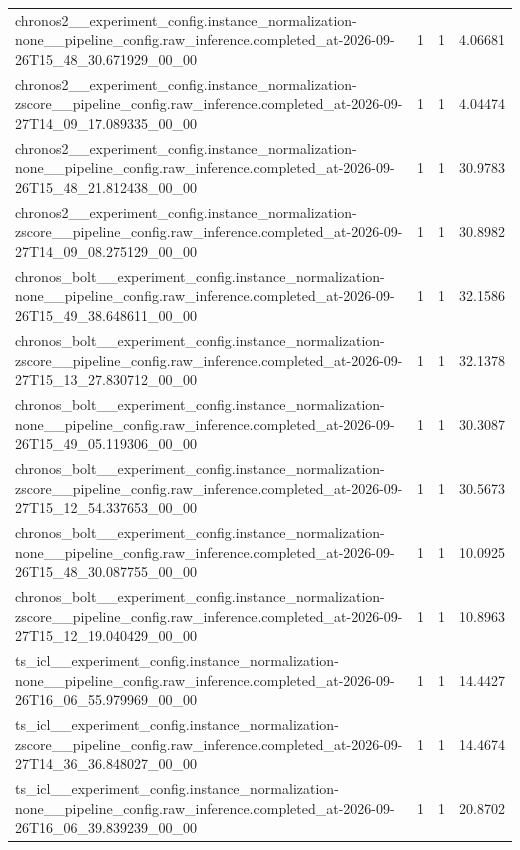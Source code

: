 \begin{tabular}{llll}
chronos2\_\_experiment\_config.instance\_normalization-none\_\_pipeline\_config.raw\_inference.completed\_at-2026-09-26T15\_48\_30.671929\_00\_00 & 1 & 1 & 4.06681 \\
chronos2\_\_experiment\_config.instance\_normalization-zscore\_\_pipeline\_config.raw\_inference.completed\_at-2026-09-27T14\_09\_17.089335\_00\_00 & 1 & 1 & 4.04474 \\
chronos2\_\_experiment\_config.instance\_normalization-none\_\_pipeline\_config.raw\_inference.completed\_at-2026-09-26T15\_48\_21.812438\_00\_00 & 1 & 1 & 30.9783 \\
chronos2\_\_experiment\_config.instance\_normalization-zscore\_\_pipeline\_config.raw\_inference.completed\_at-2026-09-27T14\_09\_08.275129\_00\_00 & 1 & 1 & 30.8982 \\
chronos\_bolt\_\_experiment\_config.instance\_normalization-none\_\_pipeline\_config.raw\_inference.completed\_at-2026-09-26T15\_49\_38.648611\_00\_00 & 1 & 1 & 32.1586 \\
chronos\_bolt\_\_experiment\_config.instance\_normalization-zscore\_\_pipeline\_config.raw\_inference.completed\_at-2026-09-27T15\_13\_27.830712\_00\_00 & 1 & 1 & 32.1378 \\
chronos\_bolt\_\_experiment\_config.instance\_normalization-none\_\_pipeline\_config.raw\_inference.completed\_at-2026-09-26T15\_49\_05.119306\_00\_00 & 1 & 1 & 30.3087 \\
chronos\_bolt\_\_experiment\_config.instance\_normalization-zscore\_\_pipeline\_config.raw\_inference.completed\_at-2026-09-27T15\_12\_54.337653\_00\_00 & 1 & 1 & 30.5673 \\
chronos\_bolt\_\_experiment\_config.instance\_normalization-none\_\_pipeline\_config.raw\_inference.completed\_at-2026-09-26T15\_48\_30.087755\_00\_00 & 1 & 1 & 10.0925 \\
chronos\_bolt\_\_experiment\_config.instance\_normalization-zscore\_\_pipeline\_config.raw\_inference.completed\_at-2026-09-27T15\_12\_19.040429\_00\_00 & 1 & 1 & 10.8963 \\
ts\_icl\_\_experiment\_config.instance\_normalization-none\_\_pipeline\_config.raw\_inference.completed\_at-2026-09-26T16\_06\_55.979969\_00\_00 & 1 & 1 & 14.4427 \\
ts\_icl\_\_experiment\_config.instance\_normalization-zscore\_\_pipeline\_config.raw\_inference.completed\_at-2026-09-27T14\_36\_36.848027\_00\_00 & 1 & 1 & 14.4674 \\
ts\_icl\_\_experiment\_config.instance\_normalization-none\_\_pipeline\_config.raw\_inference.completed\_at-2026-09-26T16\_06\_39.839239\_00\_00 & 1 & 1 & 20.8702 \\

\end{tabular}
